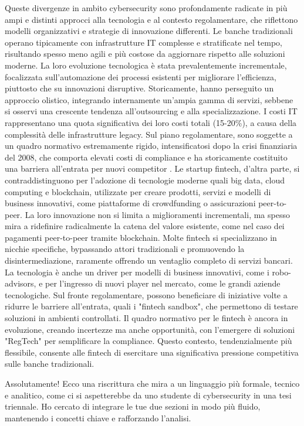 Queste divergenze in ambito cybersecurity sono profondamente radicate in più ampi e distinti approcci alla tecnologia e al contesto regolamentare, che riflettono modelli organizzativi e strategie di innovazione differenti.
Le banche tradizionali operano tipicamente con infrastrutture IT complesse e stratificate nel tempo, risultando spesso meno agili e più costose da aggiornare rispetto alle soluzioni moderne. La loro evoluzione tecnologica è stata prevalentemente incrementale, focalizzata sull’automazione dei processi esistenti per migliorare l’efficienza, piuttosto che su innovazioni disruptive. Storicamente, hanno perseguito un approccio olistico, integrando internamente un’ampia gamma di servizi, sebbene si osservi una crescente tendenza all’outsourcing e alla specializzazione. I costi IT rappresentano una quota significativa dei loro costi totali (15-20\%), a causa della complessità delle infrastrutture legacy. Sul piano regolamentare, sono soggette a un quadro normativo estremamente rigido, intensificatosi dopo la crisi finanziaria del 2008, che comporta elevati costi di compliance e ha storicamente costituito una barriera all’entrata per nuovi competitor .
Le startup fintech, d'altra parte, si contraddistinguono per l’adozione di tecnologie moderne quali big data, cloud computing e blockchain, utilizzate per creare prodotti, servizi e modelli di business innovativi, come piattaforme di crowdfunding o assicurazioni peer-to-peer. La loro innovazione non si limita a miglioramenti incrementali, ma spesso mira a ridefinire radicalmente la catena del valore esistente, come nel caso dei pagamenti peer-to-peer tramite blockchain. Molte fintech si specializzano in nicchie specifiche, bypassando attori tradizionali e promuovendo la disintermediazione, raramente offrendo un ventaglio completo di servizi bancari. La tecnologia è anche un driver per modelli di business innovativi, come i robo-advisors, e per l’ingresso di nuovi player nel mercato, come le grandi aziende tecnologiche. Sul fronte regolamentare, possono beneficiare di iniziative volte a ridurre le barriere all’entrata, quali i "fintech sandbox", che permettono di testare soluzioni in ambienti controllati. Il quadro normativo per le fintech è ancora in evoluzione, creando incertezze ma anche opportunità, con l’emergere di soluzioni "RegTech" per semplificare la compliance. Questo contesto, tendenzialmente più flessibile, consente alle fintech di esercitare una significativa pressione competitiva sulle banche tradizionali\cite{puschmann_fintech_2017}.

Assolutamente! Ecco una riscrittura che mira a un linguaggio più formale, tecnico e analitico, come ci si aspetterebbe da uno studente di cybersecurity in una tesi triennale. Ho cercato di integrare le tue due sezioni in modo più fluido, mantenendo i concetti chiave e rafforzando l'analisi.

